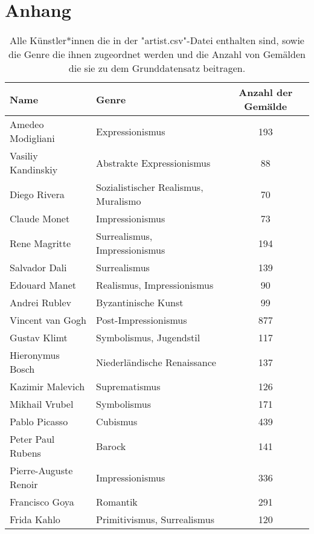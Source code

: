 \section{Anhang}
\label{sec:anhang}

\begin{table}
    \centering
    \caption{Alle Künstler*innen die in der "artist.csv"-Datei enthalten sind, sowie die Genre die ihnen zugeordnet werden und die Anzahl von Gemälden die sie zu dem Grunddatensatz beitragen.}
    \begin{tabular}{l l c}
        \toprule
        Name & Genre & Anzahl der Gemälde \\
        \midrule
        Amedeo Modigliani   &   Expressionismus                   & 193    \\
        Vasiliy Kandinskiy  &  Abstrakte Expressionismus  &  88     \\
        Diego Rivera    &        Sozialistischer Realismus, Muralismo       &  70       \\
        Claude Monet    &        Impressionismus                   &  73      \\
        Rene Magritte   &       Surrealismus, Impressionismus      & 194        \\
        Salvador Dali   &       Surrealismus                      & 139       \\
        Edouard Manet   &       Realismus, Impressionismus & 90     \\
        Andrei Rublev   &       Byzantinische Kunst   & 99        \\
        Vincent van Gogh    &    Post-Impressionismus  & 877      \\
        Gustav Klimt    &        Symbolismus, Jugendstil   & 117     \\
        Hieronymus Bosch    &    Niederländische Renaissance    & 137      \\
        Kazimir Malevich    &    Suprematismus & 126      \\
        Mikhail Vrubel  &      Symbolismus   & 171        \\
        Pablo Picasso   &       Cubismus  & 439       \\
        Peter Paul Rubens   &   Barock & 141       \\
        Pierre-Auguste Renoir &  Impressionismus   & 336      \\
        Francisco Goya  &      Romantik & 291        \\
        Frida Kahlo &         Primitivismus, Surrealismus    & 120      \\

\end{tabular}
\end{table}
